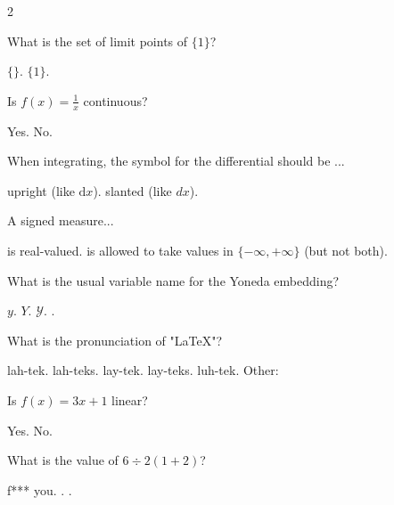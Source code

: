 \documentclass[a4paper,12pt]{exam}
\begin{document}
\begin{multicols}{2}
\begin{questions}
\begin{samepage}
    \question What is the set of limit points of $\{1\}$? 
        \begin{checkboxes}
            \choice $\{\}$.
            \choice $\{1\}$.
        \end{checkboxes}
\end{samepage}
\begin{samepage}
    \question Is $f(x)=\frac{1}{x}$ continuous? 
        \begin{checkboxes}
            \choice Yes.
            \choice No.
        \end{checkboxes}
\end{samepage}
    \question When integrating, the symbol for the differential should be ...
        \begin{checkboxes}
            \choice upright (like $\text{d}x$).
            \choice slanted (like $dx$).
        \end{checkboxes}

\begin{samepage}
    \question A signed measure...
        \begin{checkboxes}
            \choice is real-valued. 
            \choice is allowed to take values in $\{-\infty,+\infty\}$ (but not both). 
        \end{checkboxes}
\end{samepage}
    \question What is the usual variable name for the Yoneda embedding?
        \begin{checkboxes}
            \choice $y$.
            \choice $Y$.
            \choice $\mathscr{Y}$.
            \choice \!.
        \end{checkboxes}

    \question What is the pronunciation of "\LaTeX"?
        \begin{checkboxes}
            \choice lah-tek.
            \choice lah-teks.
            \choice lay-tek.
            \choice lay-teks.
            \choice luh-tek.
            \choice Other: \underline{\hspace{3cm}}
        \end{checkboxes}

    \question Is $f(x)=3x+1$ linear?
        \begin{checkboxes}
            \choice Yes.
            \choice No.
        \end{checkboxes}

    \question What is the value of $6\div2(1+2)$?
        \begin{checkboxes}
            \choice f*** you.
            .
            .
        \end{checkboxes}

\end{questions}

        \end{multicols}
\end{document}
